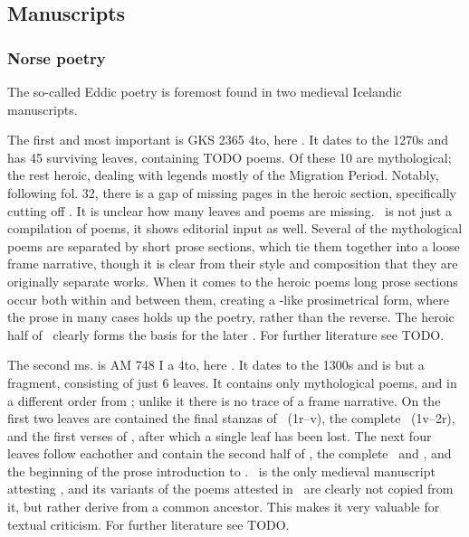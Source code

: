   \subsection{Manuscripts}

    \subsubsection{Norse poetry}
    The so-called Eddic poetry is foremost found in two medieval Icelandic manuscripts.

    The first and most important is GKS 2365 4to, here \Regius. It dates to the 1270s and has 45 surviving leaves, containing TODO poems. Of these 10 are mythological; the rest heroic, dealing with legends mostly of the Migration Period. Notably, following fol. 32, there is a gap of missing pages in the heroic section, specifically cutting off \Sigrdrifumal. It is unclear how many leaves and poems are missing.
    \Regius\ is not just a compilation of poems, it shows editorial input as well. Several of the mythological poems are separated by short prose sections, which tie them together into a loose frame narrative, though it is clear from their style and composition that they are originally separate works. When it comes to the heroic poems long prose sections occur both within and between them, creating a -like prosimetrical form, where the prose in many cases holds up the poetry, rather than the reverse. The heroic half of \Regius\ clearly forms the basis for the later \VolsungaSaga. For further literature see TODO.

    The second ms. is AM 748 I a 4to, here \AM. It dates to the 1300s and is but a fragment, consisting of just 6 leaves. It contains only mythological poems, and in a different order from \Regius; unlike it there is no trace of a frame narrative. On the first two leaves are contained the final stanzas of \Harbardsljod\ (1r–v), the complete \Baldrsdraumar\ (1v–2r), and the first verses of \Skirnismal, after which a single leaf has been lost. The next four leaves follow eachother and contain the second half of \Vafthrudnismal, the complete \Grimnismal\ and \Hymiskvida, and the beginning of the prose introduction to \Volundarkvida. \AM\ is the only medieval manuscript attesting \Baldrsdraumar, and its variants of the poems attested in \Regius\ are clearly not copied from it, but rather derive from a common ancestor. This makes it very valuable for textual criticism. For further literature see TODO.

